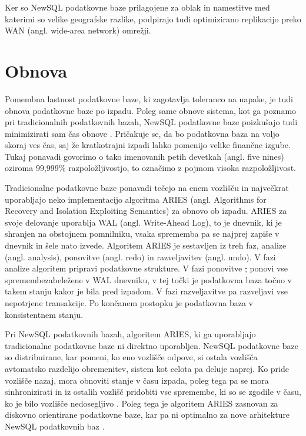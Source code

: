 \documentclass[a4paper, 12pt]{book}
\providecommand{\DIFaddtex}[1]{{\protect\color{blue}\uwave{#1}}} %
\providecommand{\DIFdeltex}[1]{{\protect\color{red}\sout{#1}}}                      %
\providecommand{\DIFaddbegin}{} %
\providecommand{\DIFaddend}{} %
\providecommand{\DIFdelbegin}{} %
\providecommand{\DIFdelend}{} %
\providecommand{\DIFadd}[1]{\texorpdfstring{\DIFaddtex{#1}}{#1}} %
\providecommand{\DIFdel}[1]{\texorpdfstring{\DIFdeltex{#1}}{}} %
\newcommand{\DIFscaledelfig}{0.5}
\newlength{\DIFdelgraphicswidth} %
\newlength{\DIFdelgraphicsheight} %
\newcommand{\DIFaddincludegraphics}[2][]{{\color{blue}\fbox{\DIFOincludegraphics[#1]{#2}}}} %
\newcommand{\DIFdelincludegraphics}[2][]{%
\sbox{\DIFdelgraphicsbox}{\DIFOincludegraphics[#1]{#2}}%
\settoboxwidth{\DIFdelgraphicswidth}{\DIFdelgraphicsbox} %
\settoboxtotalheight{\DIFdelgraphicsheight}{\DIFdelgraphicsbox} %
\scalebox{\DIFscaledelfig}{%
\parbox[b]{\DIFdelgraphicswidth}{\usebox{\DIFdelgraphicsbox}\\[-\baselineskip] \rule{\DIFdelgraphicswidth}{0em}}\llap{\resizebox{\DIFdelgraphicswidth}{\DIFdelgraphicsheight}{%
\setlength{\unitlength}{\DIFdelgraphicswidth}%
\begin{picture}(1,1)%
\thicklines\linethickness{2pt} %
{\color[rgb]{1,0,0}\put(0,0){\framebox(1,1){}}}%
{\color[rgb]{1,0,0}\put(0,0){\line( 1,1){1}}}%
{\color[rgb]{1,0,0}\put(0,1){\line(1,-1){1}}}%
\end{picture}%
}\hspace*{3pt}}} %
} %
\DeclareRobustCommand{\DIFaddbegin}{\DIFOaddbegin \let\includegraphics\DIFaddincludegraphics} %
\DeclareRobustCommand{\DIFaddend}{\DIFOaddend \let\includegraphics\DIFOincludegraphics} %
\DeclareRobustCommand{\DIFdelbegin}{\DIFOdelbegin \let\includegraphics\DIFdelincludegraphics} %
\DeclareRobustCommand{\DIFdelend}{\DIFOaddend \let\includegraphics\DIFOincludegraphics} %
\begin{document}
Ker so NewSQL podatkovne baze prilagojene za oblak in namestitve med katerimi so velike geografske razlike, podpirajo tudi optimizirano replikacijo preko WAN (angl. wide-area network) omrežji.

\section{Obnova}
Pomembna lastnost podatkovne baze, ki zagotavlja toleranco na napake, je tudi obnova podatkovne baze po izpadu. Poleg same obnove sistema, kot ga poznamo pri tradicionalnih podatkovnih bazah, NewSQL podatkovne baze  poizkušajo tudi minimizirati sam čas obnove \cite{Pavlo2016Sep}. Pričakuje se, da bo podatkovna baza na voljo skoraj ves čas, saj že kratkotrajni izpadi lahko pomenijo velike finančne izgube. Tukaj ponavadi govorimo o tako imenovanih petih devetkah (angl. five nines) oziroma 99,999\% razpoložljivostjo, to označimo z pojmom visoka razpoložljivost.

Tradicionalne podatkovne baze ponavadi tečejo na enem vozlišču in naj\-več\-krat uporabljajo neko implementacijo algoritma ARIES (angl. Algorithms for Recovery and Isolation Exploiting Semantics) za obnovo ob izpadu. ARIES za svoje delovanje uporablja WAL (angl. Write-Ahead Log), to je dnevnik, ki je shranjen na obstojnem pomnilniku, vsaka sprememba pa se najprej zapiše v dnevnik in šele nato izvede. Algoritem ARIES je sestavljen iz treh faz, analize (angl. analysis), ponovitve (angl. redo) in razveljavitev (angl. undo). V fazi analize algoritem pripravi podatkovne strukture. V fazi ponovitve \DIFdelbegin \DIFdel{, }\DIFdelend ponovi vse spremembe\DIFaddbegin \DIFadd{, }\DIFaddend zabeležene v WAL dnevniku, v tej točki je podatkovna baza točno v takem stanju kakor je bila pred izpadom. V fazi razveljavitve pa razveljavi vse nepotrjene transakcije. Po končanem postopku je podatkovna baza v konsistentnem stanju. \cite{Pavlo2016Sep}

Pri NewSQL podatkovnih bazah, algoritem ARIES, ki ga uporabljajo tradicionalne podatkovne baze ni direktno uporabljen. NewSQL podatkovne baze so distribuirane, kar pomeni, ko eno vozlišče odpove, si ostala vozlišča avtomatsko razdelijo obremenitev, sistem kot celota pa deluje naprej. Ko pride vozlišče nazaj, mora obnoviti stanje v času izpada, poleg tega pa se mora sinhronizirati in iz ostalih vozlišč pridobiti vse spremembe, ki so se zgodile v času, ko je bilo vozlišče nedosegljivo \cite{Pavlo2016Sep}. Poleg tega je algoritem ARIES zasnovan za diskovno orientirane podatkovne baze, kar pa ni optimalno za nove \DIFaddbegin \DIFadd{pomnilniško usmerjene }\DIFaddend arhitekture NewSQL podatkovnih baz \cite{zheng2014fast}.
\end{document}

